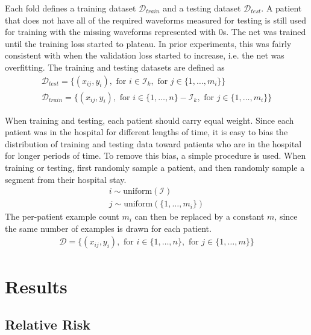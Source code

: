 Each fold defines a training dataset $\mathcal{D}_{train}$ and a testing dataset $\mathcal{D}_{test}$.  A patient that does not have all of the required waveforms measured for testing is still used for training with the missing waveforms represented with 0s.  The net was trained until the training loss started to plateau.  In prior experiments, this was fairly consistent with when the validation loss started to increase, i.e. the net was overfitting. The training and testing datasets are defined as
\begin{gather}
    \mathcal{D}_{test} = \{
        (x_{ij}, y_i),
        \text{ for } i \in \mathcal{I}_k,
        \text{ for } j \in \{ 1, \dots, m_i \}
    \} \\
    \mathcal{D}_{train} = \{
        (x_{ij}, y_i),
        \text{ for } i \in \{1, \dots, n\} - \mathcal{I}_k,
        \text{ for } j \in \{ 1, \dots, m_i \}
    \}
\end{gather}

When training and testing, each patient should carry equal weight.  Since each patient was in the hospital for different lengths of time, it is easy to bias the distribution of training and testing data toward patients who are in the hospital for longer periods of time.  To remove this bias, a simple procedure is used.  When training or testing, first randomly sample a patient, and then randomly sample a segment from their hospital stay.
\begin{gather}
    i \sim \text{uniform}(\mathcal{I}) \\
    j \sim \text{uniform}(\{1, \dots, m_i\})
\end{gather}
The per-patient example count $m_i$ can then be replaced by a constant $m$, since the same number of examples is drawn for each patient.
\begin{gather}
    \mathcal{D} = \{
        (x_{ij}, y_i),
        \text{ for } i \in \{ 1, \dots, n \},
        \text{ for } j \in \{ 1, \dots, m \}
    \}
\end{gather}

\section{Results}

\subsection{Relative Risk}

\figIcuRelativeRisk
\figIcuActualRisk

